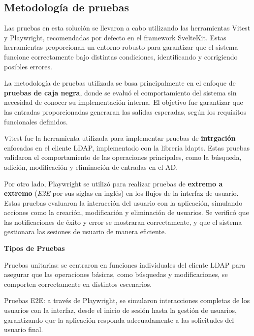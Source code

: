\subsection{Metodología de pruebas}

Las pruebas en esta solución se llevaron a cabo utilizando las herramientas Vitest y Playwright, recomendadas por defecto en el framework SvelteKit. Estas herramientas proporcionan un entorno robusto para garantizar que el sistema funcione correctamente bajo distintas condiciones, identificando y corrigiendo posibles errores.

La metodología de pruebas utilizada se basa principalmente en el enfoque de \textbf{pruebas de caja negra}, donde se evaluó el comportamiento del sistema sin necesidad de conocer su implementación interna. El objetivo fue garantizar que las entradas proporcionadas generaran las salidas esperadas, según los requisitos funcionales definidos.

Vitest fue la herramienta utilizada para implementar pruebas de \textbf{intrgación} enfocadas en el cliente LDAP, implementado con la librería ldapts. Estas pruebas validaron el comportamiento de las operaciones principales, como la búsqueda, adición, modificación y eliminación de entradas en el AD.

Por otro lado, Playwright se utilizó para realizar pruebas de \textbf{extremo a extremo} (\textit{E2E} por sus siglas en inglés) en los flujos de la interfaz de usuario. Estas pruebas evaluaron la interacción del usuario con la aplicación, simulando acciones como la creación, modificación y eliminación de usuarios. Se verificó que las notificaciones de éxito y error se mostraran correctamente, y que el sistema gestionara las sesiones de usuario de manera eficiente.

\textbf{Tipos de Pruebas}

Pruebas unitarias: se centraron en funciones individuales del cliente LDAP para asegurar que las operaciones básicas, como búsquedas y modificaciones, se comporten correctamente en distintos escenarios.

Pruebas E2E: a través de Playwright, se simularon interacciones completas de los usuarios con la interfaz, desde el inicio de sesión hasta la gestión de usuarios, garantizando que la aplicación responda adecuadamente a las solicitudes del usuario final.
